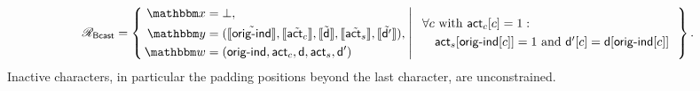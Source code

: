 \begin{displaymath}
\NPRelation_{\mathsf{Bcast}} = \left\{\,
  \begin{aligned}
    \NPInstance &= \bot,\\
    \NPInstancey &= (\Oracle{\MLE{\mathsf{orig\text{-}ind}}}, \Oracle{\MLE{\mathsf{act}_c}}, \Oracle{\MLE{\mathsf{d}}}, \Oracle{\MLE{\mathsf{act}_s}}, \Oracle{\MLE{\mathsf{d}'}}),\\
    \NPWitness &= (\mathsf{orig\text{-}ind}, \mathsf{act}_c, \mathsf{d}, \mathsf{act}_s, \mathsf{d}')
  \end{aligned}
  \;\middle|\;
  \begin{array}{l}
    \forall c\ \text{with}\ \mathsf{act}_c[c] = 1: \\[3pt]
    \quad \mathsf{act}_s[\mathsf{orig\text{-}ind}[c]] = 1\ \text{and}\ \mathsf{d}'[c] = \mathsf{d}[\mathsf{orig\text{-}ind}[c]]
  \end{array}
\,\right\}.
\end{displaymath}
\fi
Inactive characters, in particular the padding positions beyond the last character, are unconstrained.

